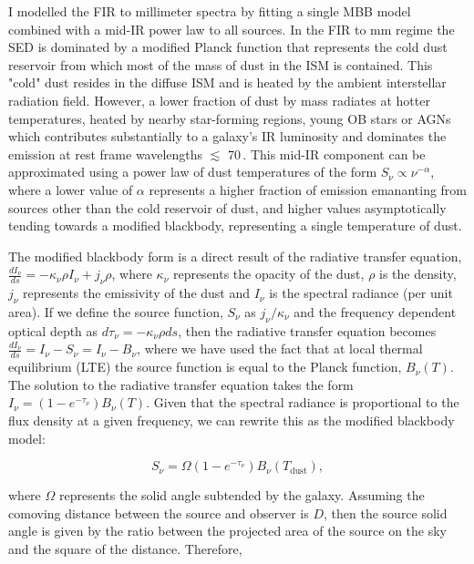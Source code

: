 I modelled the FIR to millimeter spectra by fitting a single MBB model combined with a mid-IR power law to all sources. In the FIR to mm regime the SED is dominated by a modified Planck function that represents the cold dust reservoir from which most of the mass of dust in the ISM is contained. This "cold" dust resides in the diffuse ISM and is heated by the ambient interstellar radiation field. However, a lower fraction of dust by mass radiates at hotter temperatures, heated by nearby star-forming regions, young OB stars or AGNs which contributes substantially to a galaxy's IR luminosity and dominates the emission at rest frame wavelengths $\lesssim$ 70\,\micron. This mid-IR component can be approximated using a power law of dust temperatures of the form $S_\nu \propto \nu^{-\alpha}$, where a lower value of $\alpha$ represents a higher fraction of emission emananting from sources other than the cold reservoir of dust, and higher values asymptotically tending towards a modified blackbody, representing a single temperature of dust.

The modified blackbody form is a direct result of the radiative transfer equation, $\frac{dI_\nu}{ds} = -\kappa_\nu \rho I_\nu + j_\nu \rho$, where $\kappa_\nu$ represents the opacity of the dust, $\rho$ is the density, $j_\nu$ represents the emissivity of the dust and $I_\nu$ is the spectral radiance (per unit area). If we define the source function, $S_\nu$ as $j_\nu/\kappa_\nu$ and the frequency dependent optical depth as $d\tau_\nu = -\kappa_\nu \rho ds$, then the radiative transfer equation becomes $\frac{dI_\nu}{ds} = I_\nu - S_\nu = I_\nu - B_\nu$, where we have used the fact that at local thermal equilibrium (LTE) the source function is equal to the Planck function, $B_\nu(T)$. The solution to the radiative transfer equation takes the form $I_\nu = (1 - e^{-\tau_\nu}) B_\nu(T)$. Given that the spectral radiance is proportional to the flux density at a given frequency, we can rewrite this as the modified blackbody model:

\begin{equation}
	S_\nu = \Omega(1 - e^{-\tau_\nu}) B_\nu(T_{\textrm{dust}}),
\label{eq:modified_blackbody_omega}
\end{equation}

where $\Omega$ represents the solid angle subtended by the galaxy. Assuming the comoving distance between the source and observer is $D$, then the source solid angle is given by the ratio between the projected area of the source on the sky and the square of the distance. Therefore,

